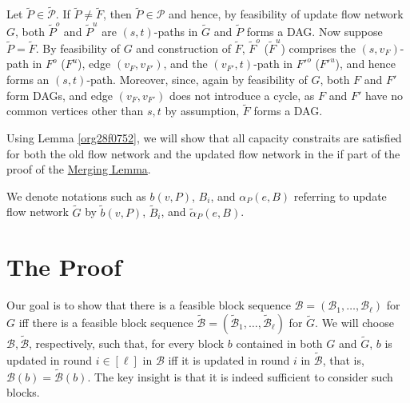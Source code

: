\documentclass[fontsize=11pt,paper=a4]{book}
\begin{document}
Let \(\tilde{P}\in\tilde{\mathcal{P}}\).
If \(\tilde{P}\neq\tilde{F}\), then \(\tilde{P}\in\mathcal{P}\) and hence, by feasibility of update flow network \(G\), both \(\tilde{P}^o\) and \(\tilde{P}^u\) are \((s,t)\)-paths in \(\tilde{G}\) and \(\tilde{P}\) forms a DAG.
Now suppose \(\tilde{P}=\tilde{F}\).
By feasibility of \(G\) and construction of \(\tilde{F}\), \(\tilde{F}^o\) (\(\tilde{F}^u\)) comprises the \((s,v_F)\)-path in \(F^o\) (\(F^u\)), edge \((v_F,v_{F'})\), and the \((v_{F'},t)\)-path in \(F'^o\) (\(F'^u\)), and hence forms an \((s,t)\)-path.
Moreover, since, again by feasibility of \(G\), both \(F\) and \(F'\) form DAGs, and edge \((v_F,v_{F'})\) does not introduce a cycle, as \(F\) and \(F'\) have no common vertices other than \(s,t\) by assumption, \(\tilde{F}\) forms a DAG.

Using Lemma \ref{org28f0752}, we will show that all capacity constraits are satisfied for both the old flow network and the updated flow network in the if part of the proof of the \hyperref[org7dbdd46]{Merging Lemma}.

We denote notations such as \(b(v,P)\), \(B_i\), and \(\alpha_P(e,B)\) referring to update flow network \(\tilde{G}\) by \(\tilde{b}(v,P)\), \(\tilde{B}_i\), and \(\tilde{\alpha}_P(e,B)\).

\section{The Proof}
\label{sec:org6663a2b}

Our goal is to show that there is a feasible block sequence \(\mathcal{B}=(\mathscr{B}_1,\dots,\mathscr{B}_{\ell})\) for \(G\) iff there is a feasible block sequence \(\tilde{\mathcal{B}}=(\tilde{\mathscr{B}}_1,\dots,\tilde{\mathscr{B}}_{\ell})\) for \(\tilde{G}\).
We will choose \(\mathcal{B},\tilde{\mathcal{B}}\), respectively, such that, for every block \(b\) contained in both \(G\) and \(\tilde{G}\), \(b\) is updated in round \(i\in[\ell]\) in \(\mathcal{B}\) iff it is updated in round \(i\) in \(\tilde{\mathcal{B}}\), that is, \(\mathcal{B}(b)=\tilde{\mathcal{B}}(b)\).
The key insight is that it is indeed sufficient to consider such blocks.
\end{document}
